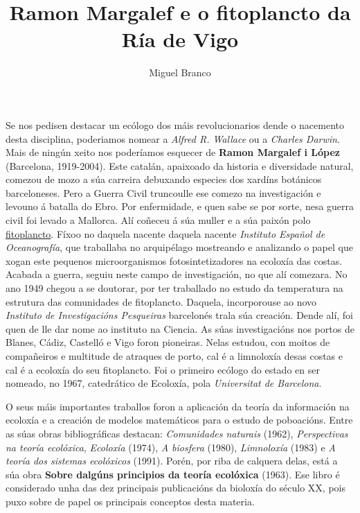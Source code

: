 \documentclass{article}
\begin{document}
\title{Ramon Margalef e o fitoplancto da Ría de Vigo}
\author{Miguel Branco}
\date{}
\maketitle



Se nos pedisen destacar un ecólogo dos máis revolucionarios dende o nacemento desta disciplina, poderiamos nomear a \textit{Alfred R. Wallace} ou a \textit{Charles Darwin}. Mais de ningún xeito nos poderíamos esquecer de \textbf{Ramon Margalef i López} (Barcelona, 1919-2004). Este catalán, apaixoado da historia e diversidade natural, comezou de mozo a súa carreira debuxando especies dos xardíns botánicos barceloneses. Pero a Guerra Civil truncoulle ese comezo na investigación e levouno á batalla do Ebro. Por enfermidade, e quen sabe se por sorte, nesa guerra civil foi levado a Mallorca. Alí coñeceu á súa muller e a súa paixón polo \href{https://gl.wikipedia.org/wiki/Fitoplancto}{fitoplancto}. Fíxoo no daquela nacente daquela nacente \textit{Instituto Español de Oceanografía}, que traballaba no arquipélago mostreando e analizando o papel que xogan este pequenos microorganismos fotosintetizadores na ecoloxía das costas. Acabada a guerra, seguiu neste campo de investigación, no que alí comezara. No ano 1949 chegou a se doutorar, por ter traballado no estudo da temperatura na estrutura das comunidades de fitoplancto. Daquela, incorporouse ao novo \textit{Instituto de Investigacións Pesqueiras} barcelonés trala súa creación. Dende alí, foi quen de lle dar nome ao instituto na Ciencia. As súas investigacións nos portos de Blanes, Cádiz, Castelló e Vigo foron pioneiras. Nelas estudou, con moitos de compañeiros e multitude de atraques de porto, cal é a limnoloxía desas costas e cal é a ecoloxía do seu fitoplancto. Foi o primeiro ecólogo do estado en ser nomeado, no 1967, catedrático de Ecoloxía, pola \textit{Universitat de Barcelona}.


O seus máis importantes traballos foron a aplicación da teoría da información na ecoloxía e a creación de modelos matemáticos para o estudo de poboacións. Entre as súas obras bibliográficas destacan: \textit{Comunidades naturais} (1962), \textit{Perspectivas na teoría ecolóxica}, \textit{Ecoloxía} (1974), \textit{A biosfera} (1980), \textit{Limnoloxía} (1983) e \textit{A teoría dos sistemas ecolóxicos} (1991). Porén, por riba de calquera delas, está a súa obra \textbf{Sobre dalgúns principios da teoría ecolóxica} (1963). Ese libro é considerado unha das dez principais publicacións da bioloxía do século XX, pois puxo sobre de papel os principais conceptos desta materia.
\end{document}
